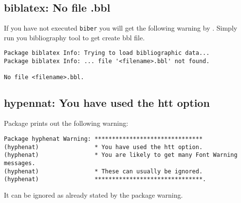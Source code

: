 \subsection{biblatex: No file \texorpdfstring{}{filename}.bbl}

If you have not executed \texttt{biber} you will get the following warning by
. Simply run you bibliography tool to get create bbl file.

\begin{verbatim}
Package biblatex Info: Trying to load bibliographic data...
Package biblatex Info: ... file '<filename>.bbl' not found.

No file <filename>.bbl.
\end{verbatim}

%

\subsection{hypennat: You have used the htt option}

Package  prints out the following warning:
%
\begin{verbatim}
Package hyphenat Warning: *******************************
(hyphenat)                * You have used the htt option.
(hyphenat)                * You are likely to get many Font Warning messages.
(hyphenat)                * These can usually be ignored.
(hyphenat)                *******************************.
\end{verbatim}
%
It can be ignored as already stated by the package warning.

%

